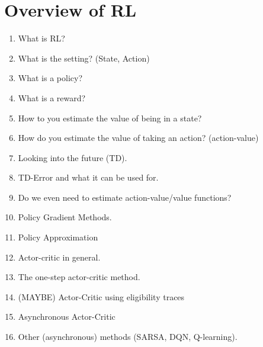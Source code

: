\documentclass[11pt]{article}
\begin{document}
\maketitle

\section{Overview of RL} 

\begin{enumerate}
    \item What is RL?
    \item What is the setting? (State, Action)
    \item What is a policy?
    \item What is a reward?
    \item How to you estimate the value of being in a state?
    \item How do you estimate the value of taking an action? (action-value)
    \item Looking into the future (TD).
    \item TD-Error and what it can be used for.
    \item Do we even need to estimate action-value/value functions?
    \item Policy Gradient Methods.
    \item Policy Approximation
    \item Actor-critic in general.
    \item The one-step actor-critic method.
    \item (MAYBE) Actor-Critic using eligibility traces
    \item Asynchronous Actor-Critic
    \item Other (asynchronous) methods (SARSA, DQN, Q-learning).
\end{enumerate}
\end{document}
